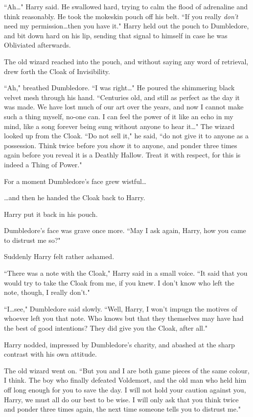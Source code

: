 ``Ah…" Harry said. He swallowed hard, trying to calm the flood of adrenaline and think reasonably. He took the mokeskin pouch off his belt. ``If you really \emph{don't} need my permission…then you have it." Harry held out the pouch to Dumbledore, and bit down hard on his lip, sending that signal to himself in case he was Obliviated afterwards.

The old wizard reached into the pouch, and without saying any word of retrieval, drew forth the Cloak of Invisibility.

``Ah," breathed Dumbledore. ``I was right…" He poured the shimmering black velvet mesh through his hand. ``Centuries old, and still as perfect as the day it was made. We have lost much of our art over the years, and now I cannot make such a thing myself, no-one can. I can feel the power of it like an echo in my mind, like a song forever being sung without anyone to hear it…" The wizard looked up from the Cloak. ``Do not sell it," he said, ``do not give it to anyone as a possession. Think twice before you show it to anyone, and ponder three times again before you reveal it is a Deathly Hallow. Treat it with respect, for this is indeed a Thing of Power."

For a moment Dumbledore's face grew wistful…

…and then he handed the Cloak back to Harry.

Harry put it back in his pouch.

Dumbledore's face was grave once more. ``May I ask again, Harry, how you came to distrust me so?"

Suddenly Harry felt rather ashamed.

``There was a note with the Cloak," Harry said in a small voice. ``It said that you would try to take the Cloak from me, if you knew. I don't know who left the note, though, I really don't."

``I…see," Dumbledore said slowly. ``Well, Harry, I won't impugn the motives of whoever left you that note. Who knows but that they themselves may have had the best of good intentions? They did give you the Cloak, after all."

Harry nodded, impressed by Dumbledore's charity, and abashed at the sharp contrast with his own attitude.

The old wizard went on. ``But you and I are both game pieces of the same colour, I think. The boy who finally defeated Voldemort, and the old man who held him off long enough for you to save the day. I will not hold your caution against you, Harry, we must all do our best to be wise. I will only ask that you think twice and ponder three times again, the next time someone tells you to distrust me."

